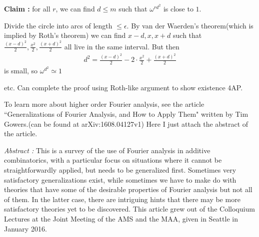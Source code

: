 \documentclass[12pt,a4paper]{report}
\newenvironment{proof}
{\begin{changemargin}{1cm}{0.5cm}
	}%
	{\end{changemargin}
}
\begin{document}
\textbf{Claim :} for all $r$, we can find $d\leq m$ such that $\omega^{rd^2}$ is close to $1$.
\begin{proof}
\pf Divide the circle into arcs of length $\leq \epsilon$. By van der Waerden's theorem(which is implied by Roth's theorem) we can find $x-d,x,x+d$ such that $\frac{(x-d)^2}{2}, \frac{x^2}{2}, \frac{(x+d)^2}{2}$ all live in the same interval. But then
\begin{align*}
d^2 = \frac{(x-d)^2}{2} - 2\cdot \frac{x^2}{2} + \frac{(x+d)^2}{2}
\end{align*}
is small, so $\omega^{d^2} \simeq 1$

\eop
\end{proof}

etc. Can complete the proof using Roth-like argument to show existence 4AP.
\s

To learn more about higher order Fourier analysis, see the article ``Generalizations of Fourier Analysis, and How to Apply Them" written by Tim Gowers.(can be found at arXiv:1608.04127v1) Here I just attach the abstract of the article.

\begin{changemargin}{1.5cm}{1.5cm}
\textit{Abstract :} This is a survey of the use of Fourier analysis in additive combinatorics, with a particular focus on situations where it cannot be straightforwardly applied, but needs to be generalized first. Sometimes very satisfactory generalizations exist, while sometimes we have to make do with theories that have some of the desirable properties of Fourier analysis but not all of them. In the latter case, there are intriguing hints that there may be more satisfactory theories yet to be discovered. This article grew out of the Colloquium Lectures at the Joint Meeting of the AMS and the MAA, given in Seattle in January 2016.
\end{changemargin}
\end{document}
